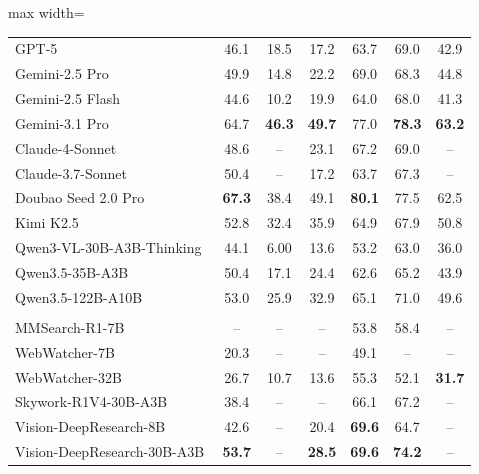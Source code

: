 \begin{table}[t]
\begin{adjustbox}{max width=\textwidth}
\begin{tabular}{lcccccc}
\midrule
\rowcolor{tablesection}
\multicolumn{7}{c}{\textbf{Agent Workflow MLLMs}} \\
\midrule
GPT-5 & 46.1 & 18.5 & 17.2 & 63.7 & 69.0 & 42.9 \\
Gemini-2.5 Pro & 49.9 & 14.8 & 22.2 & 69.0 & 68.3 & 44.8 \\
Gemini-2.5 Flash & 44.6 & 10.2 & 19.9 & 64.0 & 68.0 & 41.3 \\
Gemini-3.1 Pro & 64.7 & \textbf{46.3} & \textbf{49.7} & 77.0 & \textbf{78.3} & \textbf{63.2}\\
Claude-4-Sonnet & 48.6 & -- & 23.1 & 67.2 & 69.0 & -- \\
Claude-3.7-Sonnet & 50.4 & -- & 17.2 & 63.7 & 67.3 & -- \\
Doubao Seed 2.0 Pro & \textbf{67.3} & 38.4 & 49.1 & \textbf{80.1} & 77.5 & 62.5 \\
Kimi K2.5~\citep{team2026kimi} & 52.8 & 32.4 & 35.9 & 64.9 & 67.9 & 50.8 \\
Qwen3-VL-30B-A3B-Thinking~\citep{bai2025qwen3} & 44.1 & 6.00 & 13.6 & 53.2 & 63.0 & 36.0 \\
Qwen3.5-35B-A3B~\citep{qwen35blog} & 50.4 & 17.1 & 24.4 & 62.6 & 65.2 & 43.9 \\
Qwen3.5-122B-A10B~\citep{qwen35blog} & 53.0 & 25.9 & 32.9 & 65.1 & 71.0 & 49.6 \\

\midrule
\rowcolor{tablesection}
\multicolumn{7}{c}{\textbf{Multimodal DeepResearch MLLM}} \\
\midrule
MMSearch-R1-7B & -- & -- & -- & 53.8 & 58.4 & -- \\
WebWatcher-7B & 20.3 & -- & -- & 49.1 & -- & -- \\
WebWatcher-32B & 26.7 & 10.7 & 13.6 & 55.3 & 52.1 & \textbf{31.7} \\
Skywork-R1V4-30B-A3B~\citep{zhang2025skywork} & 38.4 & -- & -- & 66.1 & 67.2 & -- \\
Vision-DeepResearch-8B & 42.6 & -- & 20.4 & \textbf{69.6} & 64.7 & -- \\
Vision-DeepResearch-30B-A3B & \textbf{53.7} & -- & \textbf{28.5} & \textbf{69.6} & \textbf{74.2} & -- \\


\end{tabular}
\end{adjustbox}
\end{table}
